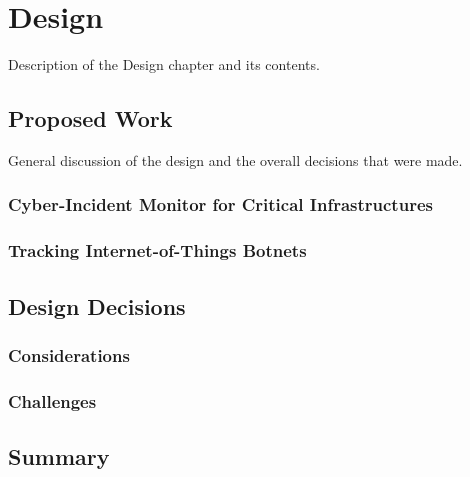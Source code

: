 \chapter{Design}

Description of the Design chapter and its contents.


\section{Proposed Work}

General discussion of the design and the overall decisions that were made.

\subsection{Cyber-Incident Monitor for Critical Infrastructures}

\subsection{Tracking Internet-of-Things Botnets}

\section{Design Decisions}

\subsection{Considerations}
\subsection{Challenges}



\section{Summary}
